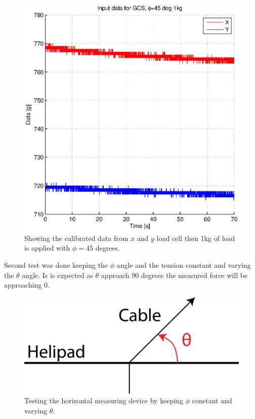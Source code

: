 \begin{figure}[H]
\centering
\includegraphics[scale=1]{graphics/gcs_test/phi45deg1kgdata.eps}
\caption[Calibrated data from $x$ and $y$ load cell]{Showing the calibrated data from $x$ and $y$ load cell then 1kg of load is applied with $\phi=45$ degrees.}
\label{fig:phi45deg1kgdata}
\end{figure}



\noindent
Second test was done keeping the $\phi$ angle and the tension constant and varying the $\theta$ angle. Is is expected as $\theta$ approach $90$ degrees the measured force will be approaching $0$. 
\begin{figure}[H]
\centering
\includegraphics[scale=0.75]{graphics/loadcell_test2.png}
\caption{Testing the horizontal measuring device by keeping $\phi$ constant and varying $\theta$.}
\label{fig:loadcell_test2}
\end{figure}

